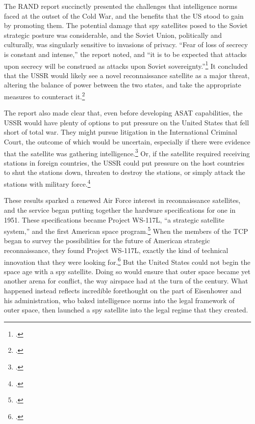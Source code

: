 \documentclass{memoir}
\begin{document}
The RAND report succinctly presented the challenges that intelligence norms faced at the outset of the Cold War, and the benefits that the US stood to gain by promoting them. The potential damage that spy satellites posed to the Soviet strategic posture was considerable, and the Soviet Union, politically and culturally, was singularly sensitive to invasions of privacy. ``Fear of loss of secrecy is constant and intense,'' the report noted, and ``it is to be expected that attacks upon secrecy will be construed as attacks upon Soviet sovereignty.''\footcite[p.~14]{kecskemetic_satellite_1950} It concluded that the USSR would likely see a novel reconnaissance satellite as a major threat, altering the balance of power between the two states, and take the appropriate measures to counteract it.\footcite[p.~13]{kecskemetic_satellite_1950}

The report also made clear that, even before developing ASAT capabilities, the USSR would have plenty of options to put pressure on the United States that fell short of total war. They might pursue litigation in the International Criminal Court, the outcome of which would be uncertain, especially if there were evidence that the satellite was gathering intelligence.\footcite[p.~16]{kecskemetic_satellite_1950} Or, if the satellite required receiving stations in foreign countries, the USSR could put pressure on the host countries to shut the stations down, threaten to destroy the stations, or simply attack the stations with military force.\footcite[p.~16-17. Importantly, these are all things that the Soviet Union could also have done with the U-2 spy plane. In fact, they might have even been more effective. Unlike the U-2 planes that took off from allied airfields, the first spy satellite, Project Corona, ejected a film capsule and required no such receiving stations. The US was somewhat more circumspect with its overflights, but the options were there.]{kecskemetic_satellite_1950}

These results sparked a renewed Air Force interest in reconnaissance satellites, and the service began putting together the hardware specifications for one in 1951. These specifications became Project WS-117L, ``a strategic satellite system,'' and the first American space program.\footcite[p.~110-111. The WS is short for ``Weapons System.'']{mcdougall_heavens_1985} When the members of the TCP began to survey the possibilities for the future of American strategic reconnaissance, they found Project WS-117L, exactly the kind of technical innovation that they were looking for.\footcite[p.~197]{brugioni_eyes_2010} But the United States could not begin the space age with a spy satellite. Doing so would ensure that outer space became yet another arena for conflict, the way airspace had at the turn of the  century. What happened instead reflects incredible forethought on the part of Eisenhower and his administration, who baked intelligence norms into the legal framework of outer space, then launched a spy satellite into the legal regime that they created.
\end{document}
